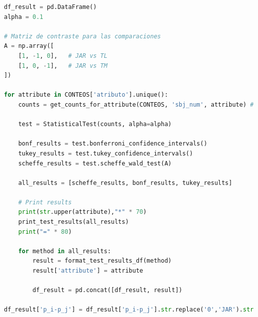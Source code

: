 \begin{lstlisting}[language=Python]
df_result = pd.DataFrame()
alpha = 0.1

# Matriz de contraste para las comparaciones
A = np.array([
    [1, -1, 0],   # JAR vs TL
    [1, 0, -1],   # JAR vs TM
])

for attribute in CONTEOS['atributo'].unique():
    counts = get_counts_for_attribute(CONTEOS, 'sbj_num', attribute) # porportions are computed inside

    test = StatisticalTest(counts, alpha=alpha)

    bonf_results = test.bonferroni_confidence_intervals()
    tukey_results = test.tukey_confidence_intervals()
    scheffe_results = test.scheffe_wald_test(A)

    all_results = [scheffe_results, bonf_results, tukey_results]

    # Print results 
    print(str.upper(attribute),"*" * 70)
    print_test_results(all_results)
    print("=" * 80)

    for method in all_results:
        result = format_test_results_df(method)
        result['attribute'] = attribute
        
        df_result = pd.concat([df_result, result]) 

df_result['p_i-p_j'] = df_result['p_i-p_j'].str.replace('0','JAR').str.replace('1','TL').str.replace('2','TM').str.replace('p_','')
\end{lstlisting}

